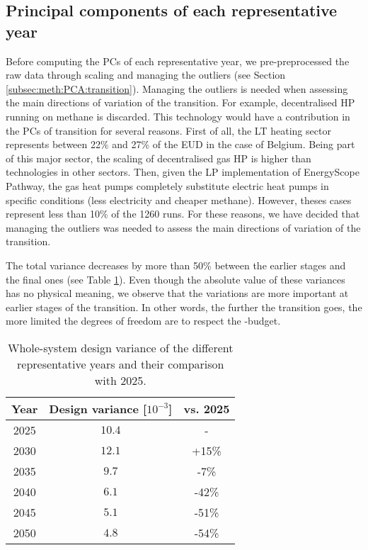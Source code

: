 \subsection{Principal components of each representative year}
\label{subsec:RobPol:PC_year}
Before computing the \gls{PCs} of each representative year, we pre-preprocessed the raw data through scaling and managing the outliers (see Section \ref{subsec:meth:PCA:transition}). Managing the outliers is needed when assessing the main directions of variation of the transition. For example, decentralised \gls{HP} running on methane is discarded. This technology would have a contribution in the \gls{PCs} of transition for several reasons. First of all, the \gls{LT} heating sector represents between 22\% and 27\% of the \gls{EUD} in the case of Belgium. Being part of this major sector, the scaling of decentralised gas \gls{HP} is higher than technologies in other sectors. Then, given the \gls{LP} implementation of EnergyScope Pathway, the gas heat pumps completely substitute electric heat pumps in specific conditions (less electricity and cheaper methane). However, theses cases represent less than 10\% of the 1260 runs. For these reasons, we have decided that managing the outliers was needed to assess the main directions of variation of the transition.

The total variance decreases by more than 50\% between the earlier stages and the final ones (see Table \ref{tab:design_variance}). Even though the absolute value of these variances has no physical meaning, we observe that the variations are more important at earlier stages of the transition. In other words, the further the transition goes, the more limited the degrees of freedom are to respect the -budget.

\begin{table}[htbp]
\caption{Whole-system design variance of the different representative years and their comparison with 2025.} 
\label{tab:design_variance}
\centering
\begin{tabular}{c c c}
\toprule
\textbf{Year}      & \textbf{Design variance} [$10^{-3}$]	 &	\textbf{vs. 2025}\\
\midrule
2025 	&	$10.4$	& - 	\\
2030 	&	$12.1$	& +15\%	\\
2035 	&	$9.7$	& -7\% 	\\
2040 	&	$6.1$	& -42\% 	\\
2045 	&	$5.1$	& -51\% 	\\
2050 	&	$4.8$	& -54\% 	\\
\bottomrule
\end{tabular}
\end{table}

